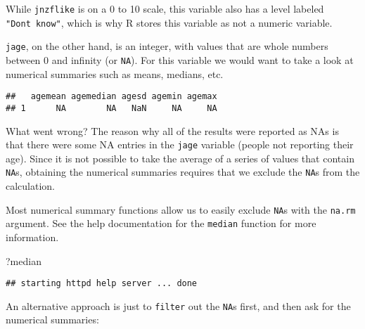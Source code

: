 \documentclass[]{article}
\newenvironment{Shaded}{\begin{snugshade}}{\end{snugshade}}
\newcommand{\KeywordTok}[1]{\textcolor[rgb]{0.13,0.29,0.53}{\textbf{#1}}}
\newcommand{\DataTypeTok}[1]{\textcolor[rgb]{0.13,0.29,0.53}{#1}}
\newcommand{\StringTok}[1]{\textcolor[rgb]{0.31,0.60,0.02}{#1}}
\newcommand{\OperatorTok}[1]{\textcolor[rgb]{0.81,0.36,0.00}{\textbf{#1}}}
\newcommand{\NormalTok}[1]{#1}
\begin{document}
While \texttt{jnzflike} is on a 0 to 10 scale, this variable also has a
level labeled \texttt{"Don\textquotesingle{}t\ know"}, which is why R
stores this variable as not a numeric variable.

\texttt{jage}, on the other hand, is an integer, with values that are
whole numbers between 0 and infinity (or \texttt{NA}). For this variable
we would want to take a look at numerical summaries such as means,
medians, etc.

\begin{Shaded}
\end{Shaded}

\begin{verbatim}
##   agemean agemedian agesd agemin agemax
## 1      NA        NA   NaN     NA     NA
\end{verbatim}

What went wrong? The reason why all of the results were reported as NAs
is that there were some NA entries in the \texttt{jage} variable (people
not reporting their age). Since it is not possible to take the average
of a series of values that contain \texttt{NA}s, obtaining the numerical
summaries requires that we exclude the \texttt{NA}s from the
calculation.

Most numerical summary functions allow us to easily exclude \texttt{NA}s
with the \texttt{na.rm} argument. See the help documentation for the
\texttt{median} function for more information.

\begin{Shaded}
\begin{Highlighting}[]
\NormalTok{?median}
\end{Highlighting}
\end{Shaded}

\begin{verbatim}
## starting httpd help server ... done
\end{verbatim}

An alternative approach is just to \texttt{filter} out the \texttt{NA}s
first, and then ask for the numerical summaries:
\end{document}
